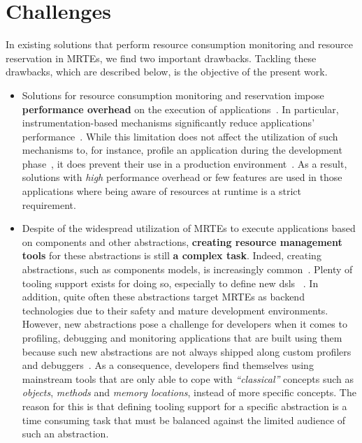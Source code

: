 \section{Challenges} \label{sec:intro-challenges}

In existing solutions that perform resource consumption monitoring and resource reservation in MRTEs, we find two important drawbacks.
Tackling these drawbacks, which are described below, is the objective of the present work.

\begin{itemize}
\item Solutions for resource consumption monitoring and reservation impose \textbf{performance overhead} on the execution of applications~\cite{Binder:2006:FEM:1173706.1173733,Marek:2012:DEL:2162037.2162046,Reiss:2008:CDP:1383559.1383566,Maurel:2012:AME:2304736.2304763}.
In particular, instrumentation-based mechanisms significantly reduce applications' performance~\cite{Dmitriev:2004:PJA:974043.974067,czajkowski_jres:_1998,Binder:2009:PPV:1464245.1464249}.
While this limitation does not affect the utilization of such mechanisms to, for instance, profile an application during the development phase~\cite{czajkowski_jres:_1998,binder_extending_2005,binder_portable_2001,Maebe06javana:a,Moret:2011:PBI:1960275.1960292, Hulaas:2008:PTL}, it does prevent their use in a production environment~\cite{Dmitriev:2004:PJA:974043.974067}.
As a result, solutions with \textit{high} performance overhead or few features are used in those applications where being aware of resources at runtime is a strict requirement.

\item Despite of the widespread utilization of MRTEs to execute applications based on components and other abstractions, \textbf{creating resource management tools} for these abstractions is still \textbf{a complex task}.
Indeed, creating abstractions, such as components models, is increasingly common~\cite{van2000domain,hutchinson2011empirical,whittle2014state}.
Plenty of tooling support exists for doing so, especially to define new \glspl{dsl} ~\cite{van2000domain,Fowler:2010:DSL:1809745,raey,Merkle:2010:TMT:1869542.1869564,Eysholdt:2010:XIY:1869542.1869625}.
In addition, quite often these abstractions target MRTEs as backend technologies due to their safety and mature development environments.
However, new abstractions pose a challenge for developers when it comes to profiling, debugging and monitoring applications that are built using them because such new abstractions are not always shipped along custom profilers and debuggers~\cite{Kolomvatsos:2012:DAC:2148250.2148478,Wu:2008:GGD:1394966.1394970,Mannadiar:2010:DDM:1964571.1964595,Lindeman:2011:DDD:2047862.2047885,Wu:2005:TDL:1094855.1094920,Faith1998}.
As a consequence, developers find themselves using mainstream tools that are only able to cope with \textit{``classical''} concepts such as \textit{objects}, \textit{methods} and \textit{memory locations}, instead of more specific concepts.
The reason for this is that defining tooling support for a specific abstraction is a time consuming task that must be balanced against the limited audience of such an abstraction.
\end{itemize}
 
